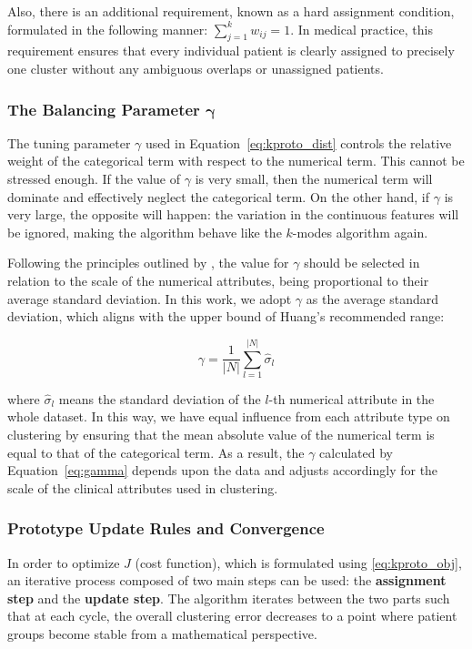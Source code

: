 Also, there is an additional requirement, known as a hard assignment condition, formulated in the following manner: $\sum_{j=1}^k w_{ij}=1$. In medical practice, this requirement ensures that every individual patient is clearly assigned to precisely one cluster without any ambiguous overlaps or unassigned patients.

\subsubsection*{The Balancing Parameter $\boldsymbol{\gamma}$}

The tuning parameter $\gamma$ used in Equation~\ref{eq:kproto_dist} controls the relative weight of the categorical term with respect to the numerical term. This cannot be stressed enough. If the value of $\gamma$ is very small, then the numerical term will dominate and effectively neglect the categorical term. On the other hand, if $\gamma$ is very large, the opposite will happen: the variation in the continuous features will be ignored, making the algorithm behave like the $k$-modes algorithm again.

Following the principles outlined by \cite{huang1998}, the value for $\gamma$ should be selected in relation to the scale of the numerical attributes, being proportional to their average standard deviation. In this work, we adopt $\gamma$ as the average standard deviation, which aligns with the upper bound of Huang's recommended range:

\begin{equation}
    \gamma = \frac{1}{|N|} \sum_{l=1}^{|N|} \hat{\sigma}_l
    \label{eq:gamma}
\end{equation}

where $\hat{\sigma}_l$ means the standard deviation of the $l$-th numerical attribute in the whole dataset. In this way, we have equal influence from each attribute type on clustering by ensuring that the mean absolute value of the numerical term is equal to that of the categorical term. As a result, the $\gamma$ calculated by Equation~\eqref{eq:gamma} depends upon the data and adjusts accordingly for the scale of the clinical attributes used in clustering.

\subsubsection*{Prototype Update Rules and Convergence}

In order to optimize $J$ (cost function), which is formulated using \eqref{eq:kproto_obj}, an iterative process composed of two main steps can be used: the \textbf{assignment step} and the \textbf{update step}. The algorithm iterates between the two parts such that at each cycle, the overall clustering error decreases to a point where patient groups become stable from a mathematical perspective.

